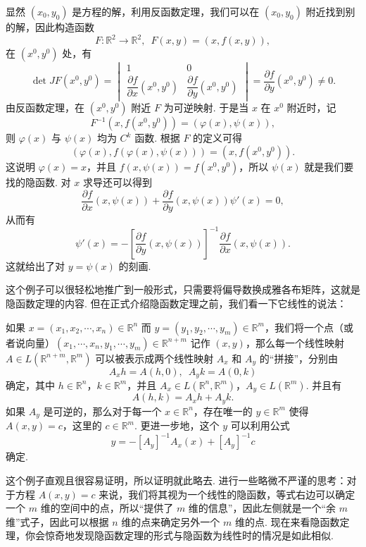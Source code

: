 \begin{solution}
    显然 $(x_0, y_0)$ 是方程的解，利用反函数定理，我们可以在 $(x_0, y_0)$ 附近找到别的解，因此构造函数\[F:\mathbb{R}^2\to \mathbb{R}^2,\enspace F(x, y) = (x, f(x, y)),\]
    在 $(x^0, y^0)$ 处，有 \[\det JF(x^0, y^0) = \begin{vmatrix}
        1 & 0 \\
        \dfrac{\partial f}{\partial x}(x^0, y^0) & \dfrac{\partial f}{\partial y}(x^0, y^0)
    \end{vmatrix} = \dfrac{\partial f}{\partial y}(x^0, y^0)\neq 0.\]
    由反函数定理，在 $(x^0, y^0)$ 附近 $F$ 为可逆映射. 于是当 $x$ 在 $x^0$ 附近时，记 \[F^{-1}(x, f(x^0, y^0)) = (\varphi(x), \psi(x)),\]
    则 $\varphi(x)$ 与 $\psi(x)$ 均为 $C^k$ 函数. 根据 $F$ 的定义可得 \[(\varphi(x), f(\varphi(x), \psi(x))) = (x, f(x^0, y^0)).\]
    这说明 $\varphi(x) = x$，并且 $f(x, \psi(x)) = f(x^0, y^0)$，所以 $\psi(x)$ 就是我们要找的隐函数. 对 $x$ 求导还可以得到 \[\frac{\partial f}{\partial x}(x, \psi(x)) + \frac{\partial f}{\partial y}(x, \psi(x))\psi'(x) = 0,\]
    从而有 \[\psi'(x) = -[\frac{\partial f}{\partial y}(x, \psi(x))]^{-1}\frac{\partial f}{\partial x}(x, \psi(x)).\]
    这就给出了对 $y = \psi(x)$ 的刻画.
\end{solution}

这个例子可以很轻松地推广到一般形式，只需要将偏导数换成雅各布矩阵，这就是隐函数定理的内容. 但在正式介绍隐函数定理之前，我们看一下它线性的说法：

\begin{example}{}{}
    如果 $x = (x_1, x_2, \cdots, x_n)\in\mathbb{R}^n$ 而 $y = (y_1, y_2, \cdots, y_m)\in\mathbb{R}^m$，我们将一个点（或者说向量）$(x_1, \cdots, x_n, y_1, \cdots, y_m)\in \mathbb{R}^{n+m}$ 记作 $(x, y)$，那么每一个线性映射 $A\in L(\mathbb{R}^{n+m}, \mathbb{R}^{m})$ 可以被表示成两个线性映射 $A_x$ 和 $A_y$ 的“拼接”，分别由 \[A_xh = A(h, 0),\enspace A_yk = A(0, k)\]
    确定，其中 $h\in\mathbb{R}^n$，$k\in\mathbb{R}^m$，并且 $A_x\in L(\mathbb{R}^n, \mathbb{R}^m)$，$A_y\in L(\mathbb{R}^m)$. 并且有 \[A(h, k) = A_xh + A_yk.\]
    如果 $A_y$ 是可逆的，那么对于每一个 $x\in\mathbb{R}^n$，存在唯一的 $y\in\mathbb{R}^m$ 使得 $A(x, y) = c$，这里的 $c\in\mathbb{R}^m$. 更进一步地，这个 $y$ 可以利用公式 \[y = -[A_y]^{-1}A_x(x) + [A_y]^{-1}c\] 确定.
\end{example}

这个例子直观且很容易证明，所以证明就此略去. 进行一些略微不严谨的思考：对于方程 $A(x, y) = c$ 来说，我们将其视为一个线性的隐函数，等式右边可以确定一个 $m$ 维的空间中的点，所以“提供了 $m$ 维的信息”，因此左侧就是一个“余 $m$ 维”式子，因此可以根据 $n$ 维的点来确定另外一个 $m$ 维的点. 现在来看隐函数定理，你会惊奇地发现隐函数定理的形式与隐函数为线性时的情况是如此相似.

